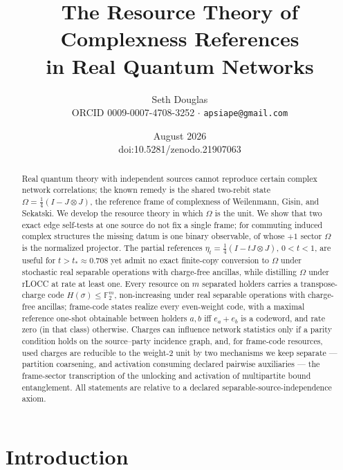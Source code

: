 \documentclass[11pt]{article}
\title{The Resource Theory of Complexness References\\
in Real Quantum Networks}
\author{Seth Douglas\\[2pt]
{\small ORCID 0009-0007-4708-3252 $\cdot$
\texttt{apsiape@gmail.com}}}
\date{August 2026\\[2pt]
{\small doi:10.5281/zenodo.21907063}}
\theoremstyle{plain}
\theoremstyle{definition}
\theoremstyle{remark}
\theoremstyle{plain}
\newcommand{\F}{\mathbb{F}}
\newcommand{\Om}{\Omega}
\begin{document}
\maketitle

\begin{abstract}
Real quantum theory with independent sources cannot reproduce
certain complex network correlations; the known remedy is the
shared two-rebit state $\Om = \tfrac14(I-J\otimes J)$, the
reference frame of complexness of Weilenmann, Gisin, and Sekatski.
We develop the resource theory in which $\Om$ is the unit. We show
that two exact edge self-tests at one source do not fix a single
frame; for commuting induced complex structures the missing datum
is one binary observable, of whose $+1$ sector $\Om$ is the
normalized projector. The partial references
$\eta_t = \tfrac14(I - tJ\otimes J)$, $0<t<1$, are useful for
$t > t_*\approx 0.708$ yet admit no exact finite-copy conversion
to $\Om$ under stochastic real separable operations with
charge-free ancillas, while distilling $\Om$ under rLOCC at rate
at least one. Every resource on $m$
separated holders carries a transpose-charge code
$H(\sigma)\le\F_2^m$, non-increasing under real separable
operations with charge-free ancillas; frame-code states realize
every even-weight code, with a maximal reference one-shot
obtainable between holders $a,b$ iff $e_a+e_b$ is a codeword, and
rate zero (in that class) otherwise. Charges can influence
network statistics only if a parity condition holds on the
source--party incidence graph, and, for frame-code resources, used
charges are
reducible to the weight-2 unit by two mechanisms we keep separate
--- partition coarsening, and activation consuming declared
pairwise auxiliaries --- the frame-sector transcription of the
unlocking and activation of multipartite bound entanglement. All statements are relative to a declared
separable-source-independence axiom.
\end{abstract}

\section{Introduction}
\end{document}
